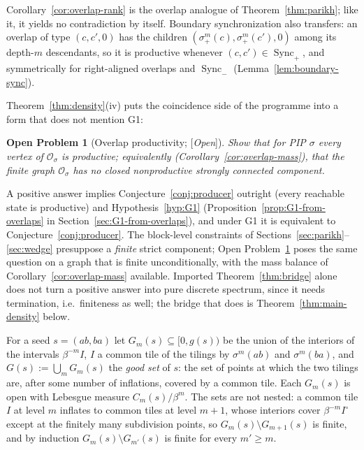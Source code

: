 \documentclass[11pt]{amsart}
\theoremstyle{plain}
\newtheorem{problem}[theorem]{Open Problem}
\theoremstyle{definition}
\theoremstyle{remark}
\newcommand{\Sync}{\operatorname{Sync}}
\newcommand{\PDS}{pure discrete spectrum}
\newcommand{\Status}[1]{\textup{[\textit{#1}]}}
\begin{document}
Corollary~\ref{cor:overlap-rank} is the overlap analogue of Theorem~\ref{thm:parikh}; like it, it yields no contradiction by itself. Boundary synchronization also transfers: an overlap of type $(c,c',0)$ has the children $(\sigma_+^m(c),\sigma_+^m(c'),0)$ among its depth-$m$ descendants, so it is productive whenever $(c,c')\in\Sync_+$, and symmetrically for right-aligned overlaps and $\Sync_-$ (Lemma~\ref{lem:boundary-sync}).

Theorem~\ref{thm:density}(iv) puts the coincidence side of the programme into a form that does not mention G1:

\begin{problem}[Overlap productivity; \Status{Open}]\label{prob:overlap-productivity}
Show that for PIP $\sigma$ every vertex of $\mathcal O_\sigma$ is productive; equivalently (Corollary~\ref{cor:overlap-mass}), that the finite graph $\mathcal O_\sigma$ has no closed nonproductive strongly connected component.
\end{problem}

A positive answer implies Conjecture~\ref{conj:producer} outright (every reachable state is productive) and Hypothesis~\ref{hyp:G1} (Proposition~\ref{prop:G1-from-overlaps} in Section~\ref{sec:G1-from-overlaps}), and under G1 it is equivalent to Conjecture~\ref{conj:producer}. The block-level constraints of Sections~\ref{sec:parikh}--\ref{sec:wedge} presuppose a \emph{finite} strict component; Open Problem~\ref{prob:overlap-productivity} poses the same question on a graph that is finite unconditionally, with the mass balance of Corollary~\ref{cor:overlap-mass} available. Imported Theorem~\ref{thm:bridge} alone does not turn a positive answer into \PDS{}, since it needs termination, i.e.\ finiteness as well; the bridge that does is Theorem~\ref{thm:main-density} below.

For a seed $s=(ab,ba)$ let $G_m(s)\subseteq[0,g(s))$ be the union of the interiors of the intervals $\beta^{-m}I$, $I$ a common tile of the tilings by $\sigma^m(ab)$ and $\sigma^m(ba)$, and $G(s):=\bigcup_mG_m(s)$ the \emph{good set} of $s$: the set of points at which the two tilings are, after some number of inflations, covered by a common tile. Each $G_m(s)$ is open with Lebesgue measure $C_m(s)/\beta^m$. The sets are not nested: a common tile $I$ at level $m$ inflates to common tiles at level $m+1$, whose interiors cover $\beta^{-m}I^\circ$ except at the finitely many subdivision points, so $G_m(s)\setminus G_{m+1}(s)$ is finite, and by induction $G_m(s)\setminus G_{m'}(s)$ is finite for every $m'\ge m$.
\end{document}
